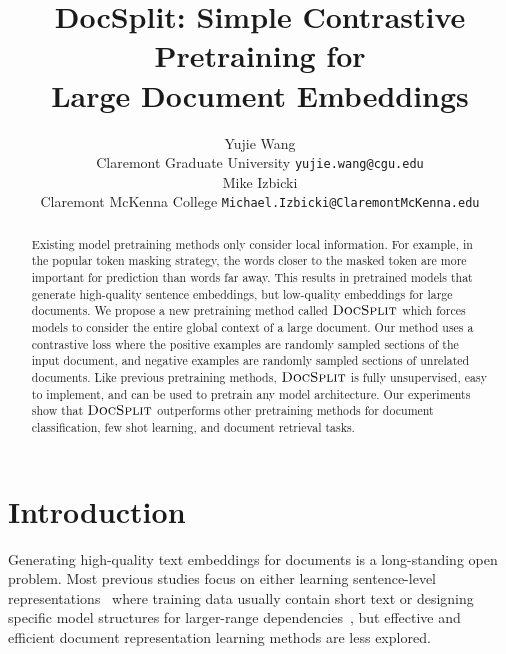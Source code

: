 \documentclass[11pt]{article}
\title{DocSplit: Simple Contrastive Pretraining for \\ Large Document Embeddings}
\author{Yujie Wang \\
  Claremont Graduate University 
  \texttt{yujie.wang@cgu.edu} \\\And
  Mike Izbicki \\
  Claremont McKenna College
  \texttt{Michael.Izbicki@ClaremontMcKenna.edu} \\}
\newcommand{\our}{\mbox{\textsc{DocSplit}}}
\begin{document}
\maketitle
\begin{abstract}

Existing model pretraining methods only consider local information.
For example, in the popular token masking strategy, the words closer to the masked token are more important for prediction than words far away.
This results in pretrained models that generate high-quality sentence embeddings, but low-quality embeddings for large documents.
We propose a new pretraining method called $\our$ which forces models to consider the entire global context of a large document.
Our method uses a contrastive loss where the positive examples are randomly sampled sections of the input document, and negative examples are randomly sampled sections of unrelated documents.
Like previous pretraining methods, $\our$ is fully unsupervised, easy to implement, and can be used to pretrain any model
architecture.
Our experiments show that $\our$ outperforms other pretraining methods for document classification, few shot learning, and document retrieval tasks.
\end{abstract}



\section{Introduction}


Generating high-quality text embeddings for documents is a long-standing open problem.
Most previous studies focus on either learning sentence-level representations~\cite{Hill2016LearningDR, Logeswaran2018AnEF, Gao2021SimCSESC} where training data usually contain short text or designing specific model structures for larger-range dependencies~\cite{Beltagy2020LongformerTL, Zaheer2020BigBT},
but effective and efficient document representation learning methods are less explored.
\end{document}
